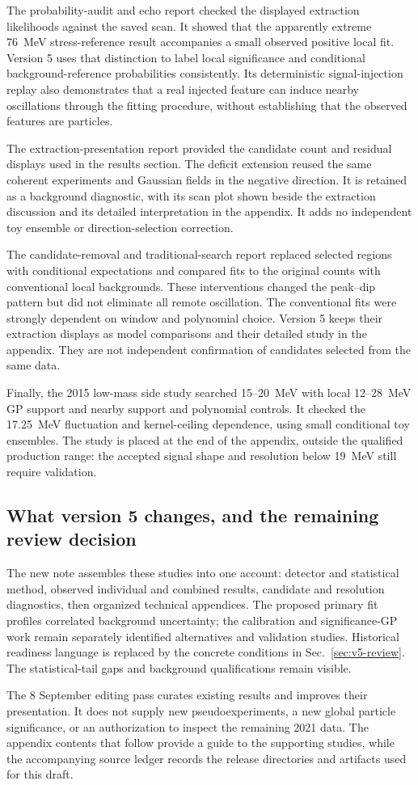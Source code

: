 The probability-audit and echo report checked the displayed extraction
likelihoods against the saved scan. It showed that the apparently extreme
76~MeV stress-reference result accompanies a small observed positive
local fit. Version 5 uses that distinction to label local significance
and conditional background-reference probabilities consistently. Its
deterministic signal-injection replay also demonstrates that a real
injected feature can induce nearby oscillations through the fitting
procedure, without establishing that the observed features are particles.

The extraction-presentation report provided the candidate count and
residual displays used in the results section. The deficit extension
reused the same coherent experiments and Gaussian fields in the negative
direction. It is retained as a background diagnostic, with its scan plot
shown beside the extraction discussion and its detailed interpretation
in the appendix. It adds no independent toy ensemble or direction-selection
correction.

The candidate-removal and traditional-search report replaced selected
regions with conditional expectations and compared fits to the original
counts with conventional local backgrounds. These interventions changed
the peak--dip pattern but did not eliminate all remote oscillation.
The conventional fits were strongly dependent on window and polynomial
choice. Version 5 keeps their extraction displays as model comparisons
and their detailed study in the appendix. They are not independent
confirmation of candidates selected from the same data.

Finally, the 2015 low-mass side study searched 15--20~MeV with local
12--28~MeV GP support and nearby support and polynomial controls.
It checked the 17.25~MeV fluctuation and kernel-ceiling dependence,
using small conditional toy ensembles. The study is placed at the end
of the appendix, outside the qualified production range: the accepted
signal shape and resolution below 19~MeV still require validation.

\subsection{What version 5 changes, and the remaining review decision}
The new note assembles these studies into one account: detector and
statistical method, observed individual and combined results, candidate
and resolution diagnostics, then organized technical appendices.
The proposed primary fit profiles correlated background uncertainty;
the calibration and significance-GP work remain separately identified
alternatives and validation studies. Historical readiness language is
replaced by the concrete conditions in Sec.~\ref{sec:v5-review}.
The statistical-tail gaps and background qualifications remain visible.

The 8 September editing pass curates existing results and improves their
presentation. It does not supply new pseudoexperiments, a new global
particle significance, or an authorization to inspect the remaining
2021 data. The appendix contents that follow provide a guide to the
supporting studies, while the accompanying source ledger records the
release directories and artifacts used for this draft.
